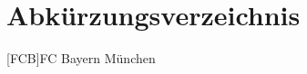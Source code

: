 \chapter*{Abkürzungsverzeichnis}

\begin{acronym}[\hspace{3cm}]

    [FCB]{FC Bayern München}

\end{acronym}